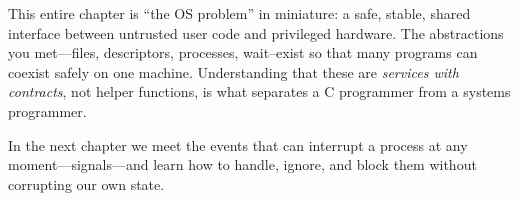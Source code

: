 \begin{osconcept}
This entire chapter is ``the OS problem'' in miniature: a safe,
stable, shared interface between untrusted user code and privileged
hardware. The abstractions you met---files, descriptors, processes,
wait--exist so that many programs can coexist safely on one machine.
Understanding that these are \emph{services with contracts}, not
helper functions, is what separates a C programmer from a systems
programmer.
\end{osconcept}

In the next chapter we meet the events that can interrupt a process at
any moment---signals---and learn how to handle, ignore, and block
them without corrupting our own state.

